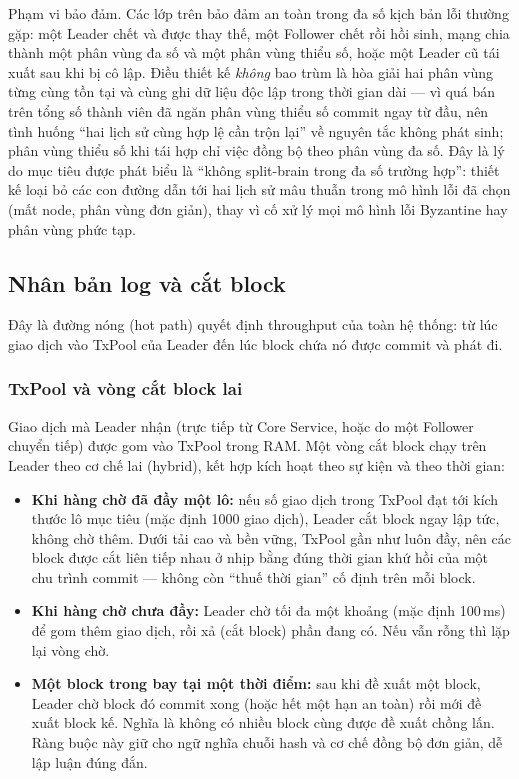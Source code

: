 Phạm vi bảo đảm. Các lớp trên bảo đảm an toàn trong đa số kịch bản
lỗi thường gặp: một Leader chết và được thay thế, một Follower chết rồi hồi sinh,
mạng chia thành một phân vùng đa số và một phân vùng thiểu số, hoặc một Leader cũ
tái xuất sau khi bị cô lập. Điều thiết kế \textit{không} bao trùm là hòa giải hai
phân vùng từng cùng tồn tại và cùng ghi dữ liệu độc lập trong thời gian dài --- vì
quá bán trên tổng số thành viên đã ngăn phân vùng thiểu số commit ngay từ đầu, nên
tình huống ``hai lịch sử cùng hợp lệ cần trộn lại'' về nguyên tắc không phát sinh;
phân vùng thiểu số khi tái hợp chỉ việc đồng bộ theo phân vùng đa số. Đây là lý do
mục tiêu được phát biểu là ``không split-brain trong đa số trường hợp'': thiết kế
loại bỏ các con đường dẫn tới hai lịch sử mâu thuẫn trong mô hình lỗi đã chọn (mất
node, phân vùng đơn giản), thay vì cố xử lý mọi mô hình lỗi Byzantine hay phân vùng
phức tạp.

\subsection{Nhân bản log và cắt block}
\label{sec:block-cutting}

Đây là đường nóng (hot path) quyết định throughput của toàn hệ thống: từ
lúc giao dịch vào TxPool của Leader đến lúc block chứa nó được commit và phát đi.

\subsubsection{TxPool và vòng cắt block lai}

Giao dịch mà Leader nhận (trực tiếp từ Core Service, hoặc do một Follower chuyển
tiếp) được gom vào TxPool trong RAM. Một vòng cắt block chạy trên Leader theo cơ
chế lai (hybrid), kết hợp kích hoạt theo sự kiện và theo thời gian:

\begin{itemize}
  \item \textbf{Khi hàng chờ đã đầy một lô:} nếu số giao dịch trong TxPool đạt tới
  kích thước lô mục tiêu (mặc định 1000 giao dịch), Leader cắt block ngay
  lập tức, không chờ thêm. Dưới tải cao và bền vững, TxPool gần như luôn đầy, nên
  các block được cắt liên tiếp nhau ở nhịp bằng đúng thời gian khứ hồi của một chu
  trình commit --- không còn ``thuế thời gian'' cố định trên mỗi block.
  \item \textbf{Khi hàng chờ chưa đầy:} Leader chờ tối đa một khoảng (mặc định
  100\,ms) để gom thêm giao dịch, rồi xả (cắt block) phần đang có. Nếu vẫn rỗng thì
  lặp lại vòng chờ.
  \item \textbf{Một block trong bay tại một thời điểm:} sau khi đề xuất một block,
  Leader chờ block đó commit xong (hoặc hết một hạn an toàn) rồi mới đề xuất block
  kế. Nghĩa là không có nhiều block cùng được đề xuất chồng lấn. Ràng buộc này giữ
  cho ngữ nghĩa chuỗi hash và cơ chế đồng bộ đơn giản, dễ lập luận đúng đắn.
\end{itemize}

